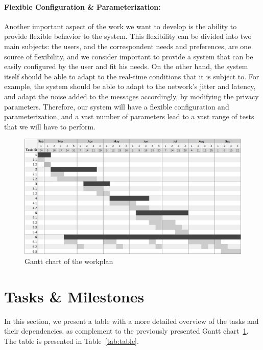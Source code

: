 \paragraph{Flexible Configuration \& Parameterization:} Another important aspect of the work we want to develop is the ability to provide flexible behavior to the system. This flexibility can be divided into two main subjects: the users, and the correspondent needs and preferences, are one source of flexibility, and we consider important to provide a system that can be easily configured by the user and fit his needs. On the other hand, the system itself should be able to adapt to the real-time conditions that it is subject to. For example, the system should be able to adapt to the network's jitter and latency, and adapt the noise added to the messages accordingly, by modifying the privacy parameters. Therefore, our system will have a flexible configuration and parameterization, and a vast number of parameters lead to a vast range of tests that we will have to perform.  



\begin{figure}
    \centering
    \includegraphics[width=\textwidth]{Chapters/Figures/Gantt.png}
    \caption{Gantt chart of the workplan}
    \label{fig:gantt}
\end{figure}

\section{Tasks \& Milestones}

In this section, we present a table with a more detailed overview of the tasks and their dependencies, as complement to the previously presented Gantt chart~\ref{fig:gantt}. The table is presented in Table~\ref{tab:table}.

\newcommand{\maintask}[3]{%
    \rowcolor[HTML]{E3E3E3} 
    \textbf{#1} & \textbf{#2} & \textbf{#3} & \textbf{} \\ \hline
}

